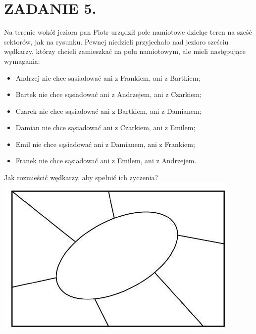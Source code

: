 \documentclass[10pt]{article}
\begin{document}
\section*{ZADANIE 5.}
Na terenie wokół jeziora pan Piotr urządził pole namiotowe dzieląc teren na sześć sektorów, jak na rysunku. Pewnej niedzieli przyjechało nad jezioro sześciu wędkarzy, którzy chcieli zamieszkać na polu namiotowym, ale mieli następujące wymagania:

\begin{itemize}
  \item Andrzej nie chce sąsiadować ani z Frankiem, ani z Bartkiem;
  \item Bartek nie chce sąsiadować ani z Andrzejem, ani z Czarkiem;
  \item Czarek nie chce sąsiadować ani z Bartkiem, ani z Damianem;
  \item Damian nie chce sąsiadować ani z Czarkiem, ani z Emilem;
  \item Emil nie chce sąsiadować ani z Damianem, ani z Frankiem;
  \item Franek nie chce sąsiadować ani z Emilem, ani z Andrzejem.
\end{itemize}

Jak rozmieścić wędkarzy, aby spełnić ich życzenia?\\
\includegraphics[max width=\textwidth, center]{2024_11_21_868b5a0db8658c5e2e18g-1(1)}
\end{document}
